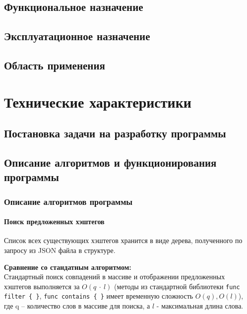 \documentclass[a4paper,12pt]{article}
\begin{document}
	\subsection{Функциональное назначение}
	
	\subsection{Эксплуатационное назначение}
	
	\subsection{Область применения}
	
	
					\newpage 
	\section{Технические характеристики}
	\subsection{Постановка задачи на разработку программы}
	
	
		
	
	\subsection{Описание алгоритмов и функционирования программы}
	\subsubsection{Описание алгоритмов программы}
	\paragraph{Поиск предложенных хэштегов\\}
		
		Список всех существующих хэштегов хранится в виде дерева, полученного по запросу из JSON файла в структуре.
		
		 \label{code: treeStruct}
		\textbf{Сравнение со стандатным алгоритмом:\\} \indent
		 Стандартный поиск совпадений в массиве и отображении предложенных хэштегов выполняется  за $O(q\  \cdot\  l)$ (методы из стандартной библиотеки \verb|func filter { }|, \verb|func contains { }|  имеет временную сложность $O(q), O(l)$), где q -- количество слов в массиве для поиска, а $l$ - максимальная длина слова.
		 
\end{document}
